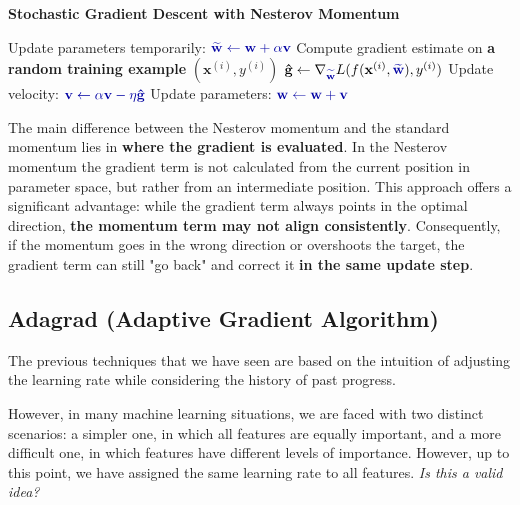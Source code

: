\begin{algorithm}
\renewcommand\thealgorithm{}
\caption{\textbf{\textcolor{mygreen}{Stochastic Gradient Descent with Nesterov Momentum}}}
\begin{algorithmic}[1]
\STATE Update parameters temporarily:
$\textcolor{mybluee}{\widetilde{\mathbf{w}} \leftarrow \mathbf{w} + \alpha \mathbf{v}}$
\STATE Compute gradient estimate on \textbf{\textcolor{myred}{a random training example}} $(\mathbf{x}^{(i)}, y^{(i)})$
\STATE $\mathbf{\hat{g}} \leftarrow \nabla_{\textcolor{mybluee}{\widetilde{\mathbf{w}}}} L(f(\mathbf{x}^{(i)},\textcolor{mybluee}{\widetilde{\mathbf{w}}}), y^{(i)})$
\STATE Update velocity:
$\textcolor{mybluee}{\mathbf{v} \leftarrow \alpha \mathbf{v} - \eta \mathbf{\hat{g}}}$
\STATE Update parameters:
$\textcolor{mybluee}{\mathbf{w} \leftarrow \mathbf{w} + \mathbf{v}}$
\ENDWHILE
\end{algorithmic}
\end{algorithm}

The main difference between the Nesterov momentum and the standard momentum lies in \textbf{where the gradient is evaluated}. In the Nesterov momentum the gradient term is not calculated from the current position in parameter space, but rather from an intermediate position. This approach offers a significant advantage: while the gradient term always points in the optimal direction, \textbf{the momentum term may not align consistently}. Consequently, if the momentum goes in the wrong direction or overshoots the target, the gradient term can still "go back" and correct it \textbf{in the same update step}.

\newpage
\subsection{Adagrad (Adaptive Gradient Algorithm)}
The previous techniques that we have seen are based on the intuition of adjusting the learning rate while considering the history of past progress.

However, in many machine learning situations, we are faced with two distinct scenarios: a simpler one, in which all features are equally important, and a more difficult one, in which features have different levels of importance. However, up to this point, we have assigned the same learning rate to all features. \textit{Is this a valid idea?}

